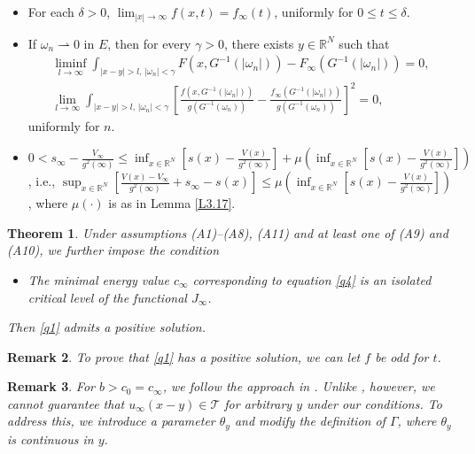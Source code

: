 \documentclass[10pt,a4paper]{amsart}
\numberwithin{equation}{section}
\newtheorem{theorem}{Theorem}[section]
\newtheorem{remark}[theorem]{Remark}
\begin{document}
\begin{itemize}
\item[(A9)] For each $\delta>0$, $\lim_{|x|\to\infty}f(x,t)=f_{\infty}(t)$, uniformly for 
$0\leq t\leq\delta$.

\item[(A10)]   If $\omega_n \rightharpoonup 0$ in $E$, then for every $\gamma>0$, 
there exists $y\in{\mathbb{R}^N}$ such that 
\begin{gather*}
\liminf_{l\to \infty}\int_{|x-y|>l,\,|\omega_n|<\gamma}F(x,G^{-1}(|\omega_n|))-F_{\infty}(G^{-1}(|\omega_n|))=0, \\
\lim_{l\to \infty}\int_{|x-y|>l,\,|\omega_n|<\gamma}[\frac{f(x,G^{-1}(|\omega_n|))}{g(G^{-1}
(\omega_n))}-\frac{f_{\infty}(G^{-1}(|\omega_n|))}{g(G^{-1}(\omega_n))}]^2=0,
\end{gather*}
uniformly for $n$.

\item[(A11)] $0<s_{\infty}-\frac{V_{\infty}}{g^2(\infty)}\leq\inf _{x\in{\mathbb{R}^N}}[s(x)-\frac{V(x)}{g^2(\infty)}]
+\mu(\inf _{x\in{\mathbb{R}^N}}[s(x)-\frac{V(x)}{g^2(\infty)}])$, i.e., 
$\sup _{x\in{\mathbb{R}^N}}[\frac{V(x)-V_{\infty}}{g^2(\infty)} +s_{\infty}-s(x)]\leq\mu(\inf _{x\in{\mathbb{R}^N}}[s(x)-\frac{V(x)}{g^2(\infty)}])$, 
where $\mu(\cdot)$ is as in Lemma \ref{L3.17}.
\end{itemize}


\begin{theorem}\label{thm1.1}
Under assumptions {\rm (A1)--(A8), (A11)}   and at least one of {\rm (A9)} and {\rm (A10)},
we further impose the condition
\begin{itemize} %
\item[(A12)] The minimal energy value $c_{\infty}$ corresponding to equation \eqref{q4} is an isolated critical level of the functional $J_{\infty}$.
\end{itemize}
Then \eqref{q1} admits a positive solution. 
\end{theorem}

\begin{remark}\label{r1} \rm
To prove that \eqref{q1} has a positive solution, we  can let  $f$ be odd for $t$.
\end{remark}

\begin{remark}\label{r2} \rm
For \( b > c_0=c_\infty \), we follow the approach in \cite{Ambrosetti}. 
Unlike \cite{Ambrosetti}, however, we cannot guarantee that \( u_\infty(x - y) \in \mathcal{T} \) 
for arbitrary \( y \) under our conditions. To address this, we introduce a parameter \( \theta_y \) 
and modify the definition of \( \Gamma \), where \( \theta_y \) is continuous in \( y \).
\end{remark}
\end{document}
